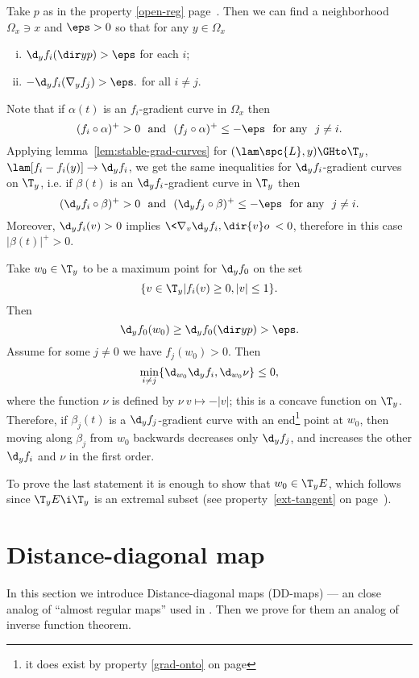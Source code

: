  Take $p$ as in the property \ref{open-reg} page~\pageref{open-reg}.
Then we can find a neighborhood $\Omega_x\ni x$ and $\eps>0$ so that for any
$y\in \Omega_x$
\begin{enumerate}[(i)]
\item $\d_y f_i(\dir y p)>\eps$ for each $i$;
\item $-\d_y f_i(\nabla_y f_j)>\eps.$ for all $i\not=j$.
\end{enumerate}

Note that if $\alpha(t)$ is an $f_i$-gradient curve in $\Omega_x$ then 
$$(f_i\circ\alpha)^+>0
\ \ \text{and}\ \ 
(f_j\circ\alpha)^+\le -\eps
\ \ \text{for any}\ \ 
j\not=i.$$
Applying  lemma~\ref{lem:stable-grad-curves} for
$(\lam \spc{L},y)\GHto \T_y$, $\lam[f_i-f_i(y)]\to \d_y f_i$, we get the same inequalities for 
$\d_y f_i$-gradient curves on $\T_y$, i.e. if $\beta(t)$ is an $\d_y
f_i$-gradient curve in $\T_y$ then 
$$(\d_y f_i\circ\beta)^+>0\ \ \text{and}\ \ (\d_y f_j\circ\beta)^+\le-\eps\ \
\text{for any}\ \ j\not=i.$$
Moreover, $\d_y f_i(v)>0$
implies $\<\nabla_v\d_y f_i,\dir {v}o\><0$, therefore in this case $|\beta(t)|^+>0$.

Take $w_0\in \T_y$ to be a maximum point for $\d_y f_0$ on the set 
$$\{v\in \T_y|f_i(v)\ge0, |v|\le 1\}.$$
Then
$$\d_y f_0(w_0)\ge \d_y f_0(\dir y p)>\eps.$$
Assume for some $j\not=0$ we have $f_j(w_0)>0$.
Then 
$$\min_{i\not=j} \{\d_{w_0}\d_y f_i,\d_{w_0}\nu\}\le 0,$$
where the function $\nu$ is defined by $\nu\:v\mapsto -|v|$; this is a concave function
on $\T_y$.
Therefore, if $\beta_j(t)$ is a $\d_y f_j$-gradient curve with an end\footnote{it does exist by property \ref{grad-onto} on page
\pageref{grad-onto}} point at
$w_0$, then moving along $\beta_j$ from $w_0$ backwards decreases only
$\d_y f_j$,  and increases the other $\d_y f_i$ and $\nu$ in the first order.\contradiction

To prove the last statement it is enough to show that $w_0\in \T_y E$, which follows since $\T_y E\i \T_y$ is an extremal subset (see property~\ref{ext-tangent} on page~\pageref{ext-tangent}).  \qeds









\section{Distance-diagonal map}

In this section we introduce Distance-diagonal maps (DD-maps) --- an close analog of ``almost regular maps'' used in \cite[11.7]{BGP}. 
Then we prove for them an analog of inverse function theorem.


